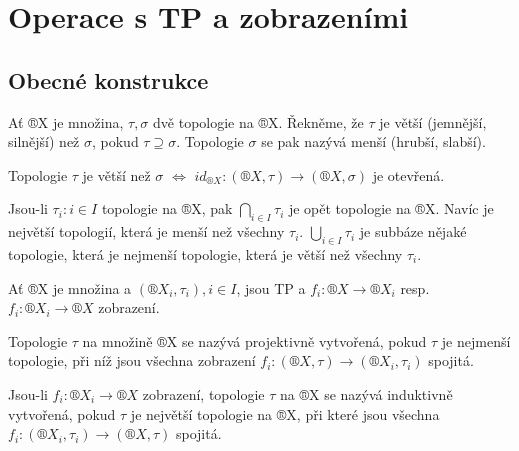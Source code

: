 \documentclass[12pt]{article}					%
\begin{document}
\section{Operace s TP a zobrazeními}
    \subsection{Obecné konstrukce}
        \begin{definice}
            Ať ®X je množina, $\tau, \sigma$ dvě topologie na ®X. Řekněme, že $\tau$ je větší (jemnější, silnější) než $\sigma$, pokud $\tau \supseteq \sigma$. Topologie $\sigma$ se pak nazývá menší (hrubší, slabší).
        \end{definice}

        \begin{poznamka}
            Topologie $\tau$ je větší než $\sigma$ $\Leftrightarrow$ $id_{®X}: (®X, \tau) \rightarrow (®X, \sigma)$ je otevřená.

            Jsou-li $\tau_i: i \in I$ topologie na ®X, pak $\bigcap_{i \in I}\tau_i$ je opět topologie na ®X. Navíc je největší topologií, která je menší než všechny $\tau_i$. $\bigcup_{i \in I} \tau_i$ je subbáze nějaké topologie, která je nejmenší topologie, která je větší než všechny $\tau_i$.
        \end{poznamka}

        \begin{definice}
            Ať ®X je množina a $(®X_i, \tau_i), i \in I$, jsou TP a $f_i: ®X \rightarrow ®X_i$ resp. $f_i: ®X_i \rightarrow ®X$ zobrazení.

            Topologie $\tau$ na množině ®X se nazývá projektivně vytvořená, pokud $\tau$ je nejmenší topologie, při níž jsou všechna zobrazení $f_i: (®X, \tau) \rightarrow (®X_i, \tau_i)$ spojitá.

            Jsou-li $f_i:®X_i \rightarrow ®X$ zobrazení, topologie $\tau$ na ®X se nazývá induktivně vytvořená, pokud $\tau$ je největší topologie na ®X, při které jsou všechna $f_i: (®X_i, \tau_i) \rightarrow (®X, \tau)$ spojitá.
        \end{definice}
\end{document}
